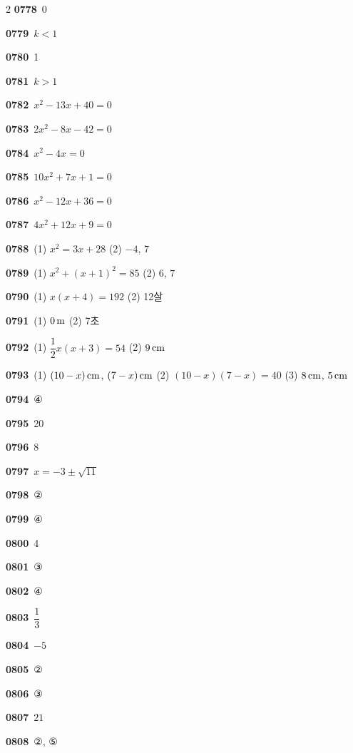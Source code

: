 \documentclass[10pt,a4paper]{article}
\begin{document}
\begin{multicols}{2}
\noindent\textbf{0778}\ 0\par
\noindent\textbf{0779}\ $k<1$\par
\noindent\textbf{0780}\ 1\par
\noindent\textbf{0781}\ $k>1$\par
\noindent\textbf{0782}\ $x^2-13x+40=0$\par
\noindent\textbf{0783}\ $2x^2-8x-42=0$\par
\noindent\textbf{0784}\ $x^2-4x=0$\par
\noindent\textbf{0785}\ $10x^2+7x+1=0$\par
\noindent\textbf{0786}\ $x^2-12x+36=0$\par
\noindent\textbf{0787}\ $4x^2+12x+9=0$\par
\noindent\textbf{0788}\ (1) $x^2=3x+28$ (2) $-4$, $7$\par
\noindent\textbf{0789}\ (1) $x^2+(x+1)^2=85$ (2) $6$, $7$\par
\noindent\textbf{0790}\ (1) $x(x+4)=192$ (2) 12살\par
\noindent\textbf{0791}\ (1) $0\mkern3mu \mathrm{m}$ (2) 7초\par
\noindent\textbf{0792}\ (1) $\dfrac{1}{2}x(x+3)=54$ (2) $9\mkern3mu \mathrm{cm}$\par
\noindent\textbf{0793}\ (1) $(10-x)\mkern3mu \mathrm{cm}$, $(7-x)\mkern3mu \mathrm{cm}$ (2) $(10-x)(7-x)=40$ (3) $8\mkern3mu \mathrm{cm}$, $5\mkern3mu \mathrm{cm}$\par
\noindent\textbf{0794}\ ④\par
\noindent\textbf{0795}\ 20\par
\noindent\textbf{0796}\ 8\par
\noindent\textbf{0797}\ $x=-3\pm\sqrt{11}$\par
\noindent\textbf{0798}\ ②\par
\noindent\textbf{0799}\ ④\par
\noindent\textbf{0800}\ 4\par
\noindent\textbf{0801}\ ③\par
\noindent\textbf{0802}\ ④\par
\noindent\textbf{0803}\ $\dfrac{1}{3}$\par
\noindent\textbf{0804}\ $-5$\par
\noindent\textbf{0805}\ ②\par
\noindent\textbf{0806}\ ③\par
\noindent\textbf{0807}\ $21$\par
\noindent\textbf{0808}\ ②, ⑤\par

\end{multicols}
\end{document}
